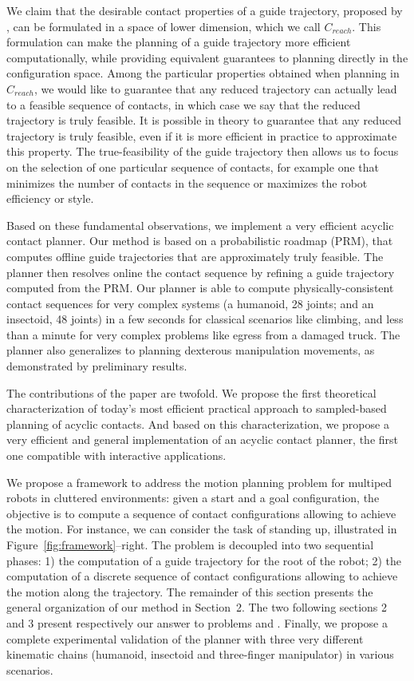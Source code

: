 We claim that the desirable contact properties of a guide trajectory, proposed by \citeauthor{Bouyarmane2009}, can be formulated in a space of lower dimension, which we call $C_{reach}$. This formulation can make the planning of a guide trajectory more efficient computationally, while providing equivalent guarantees to planning directly in the configuration space. Among the particular properties obtained when planning in $C_{reach}$, we would like to guarantee that any reduced trajectory can actually lead to a feasible sequence of contacts, in which case we say that the reduced trajectory is truly feasible. It is possible in theory to guarantee that any reduced trajectory is truly feasible, even if it is more efficient in practice to approximate this property. The true-feasibility of the guide trajectory then allows us to focus on the selection of one particular sequence of contacts, for example one that minimizes the number of contacts in the sequence or maximizes the robot efficiency or style.

Based on these fundamental observations, we implement a very efficient acyclic contact planner. Our method is based on a probabilistic roadmap (PRM), that computes offline guide trajectories that are approximately truly feasible. The planner then resolves online the contact sequence by refining a guide trajectory computed from the PRM. Our planner is able to compute physically-consistent contact sequences for very complex systems (a humanoid, 28 joints; and an insectoid, 48 joints) in a few seconds for classical scenarios like climbing, and less than a minute for very complex problems like egress from a damaged truck. The planner also generalizes to planning dexterous manipulation movements, as demonstrated by preliminary results.

The contributions of the paper are twofold. We propose the first theoretical characterization of today's most efficient practical approach to sampled-based planning of acyclic contacts. And based on this characterization, we propose a very efficient and general implementation of an acyclic contact planner, the first one compatible with interactive applications. 

We propose a framework to address the motion planning problem for multiped robots in cluttered environments: given a start and a goal configuration, the objective is to compute a sequence of contact configurations allowing to achieve the motion. For instance, we can consider the task of standing up, illustrated in Figure~\ref{fig:framework}--right. The problem is decoupled into two sequential phases: 1) the computation of a guide trajectory for the root of the robot; 2) the computation of a discrete sequence of contact configurations allowing to achieve the motion along the trajectory.
%
The remainder of this section presents the general organization of our method in Section~2. The two following sections 2 and 3 present respectively our answer to problems \Pa and \Pb. Finally, we propose a complete experimental validation of the planner with three very different kinematic chains (humanoid, insectoid and three-finger manipulator) in various scenarios.
